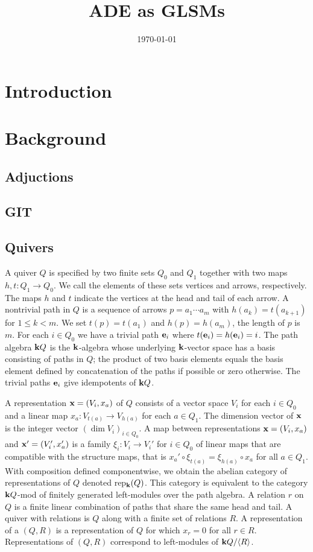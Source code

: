 \documentclass{amsart}
\title{ADE as GLSMs}
\date{\today}
\theoremstyle{definition}
\begin{document}
\maketitle

\section{Introduction}

\section{Background}\label{sc:background}


\subsection{{\red Adjuctions}}

\subsection{{\red GIT}}

\subsection{Quivers}
A quiver $Q$ is specified by two finite sets $Q_0$ and $Q_1$ together with two maps $h, t \colon Q_1 \rightarrow Q_0$. We call the elements of these sets vertices and arrows, respectively.  The maps $h$ and $t$ indicate the vertices at the head and tail of each arrow.
A nontrivial path in $Q$ is a sequence of arrows $p = a_1 \dotsb a_m$ with $h(a_{k}) = t(a_{k+1})$ for $1 \leq k < m$.  We set $t(p) = t(a_{1})$ and $h(p)= h(a_m)$, the length of $p$ is $m$.  
For each $i \in Q_0$ we have a trivial path $\mathbf{e}_i$ where $t(\mathbf{e}_i) = h(\mathbf{e}_i) = i$.  
The path algebra $\mathbf{k} Q$ is the $\mathbf{k}$-algebra whose underlying $\mathbf{k}$-vector space has a basis consisting of paths in $Q$; the product of two basis elements equals the basis element defined by concatenation of the paths if possible or zero otherwise.
The trivial paths $\mathbf{e}_i$ give idempotents of $\mathbf{k} Q$.

A representation $\mathbf{x} = (V_i, x_a)$ of $Q$ consists of a vector space $V_i$ for each $i \in Q_0$ and a linear map $x_a \colon V_{t(a)} \rightarrow V_{h(a)}$ for each $a \in Q_1$. 
The dimension vector of $\mathbf{x}$ is the integer vector $(\dim V_{i})_{i\in Q_0}$.  
A map between representations $\mathbf{x} = (V_i, x_a)$ and $\mathbf{x}' = (V_i', x_a')$ is a family $\xi_{i} \colon V_i^{\,} \rightarrow V_i'$ for $i \in Q_0$ of linear maps that are compatible with the structure maps, that is $x_a' \circ\xi_{t(a)} = \xi_{h(a)} \circ x_a$ for all $a \in Q_1$.  
With composition defined componentwise, we obtain the abelian category of representations of $Q$ denoted rep$_{\mathbf{k}}(Q)$. 
This category is equivalent to the category $\mathbf{k} Q$-mod of finitely generated left-modules over the path algebra.
A relation $r$ on $Q$ is a finite linear combination of paths that share the same head and tail.
A quiver with relations is $Q$ along with a finite set of relations $R$.
A representation of a $(Q,R)$ is a representation of $Q$ for which $x_r=0$ for all $r\in R$.
Representations of $(Q,R)$ correspond to left-modules of $\mathbf{k} Q/ \langle R \rangle$.
\end{document}

